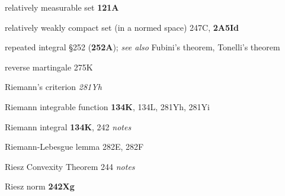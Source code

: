 relatively measurable set {\bf 121A}



relatively weakly compact set (in a normed space) 247C,
{\bf 2A5Id}









repeated integral \S252 ({\bf 252A}); 
  {\it see also} Fubini's theorem, Tonelli's theorem

































reverse martingale 275K







Riemann's criterion {\it 281Yh}


Riemann integrable function {\bf 134K}, 134L,
  281Yh, 281Yi

Riemann integral {\bf 134K},
  242 {\it notes}
  

Riemann-Lebesgue lemma 282E, 282F




Riesz Convexity Theorem 244 {\it notes}






Riesz norm {\bf 242Xg}






